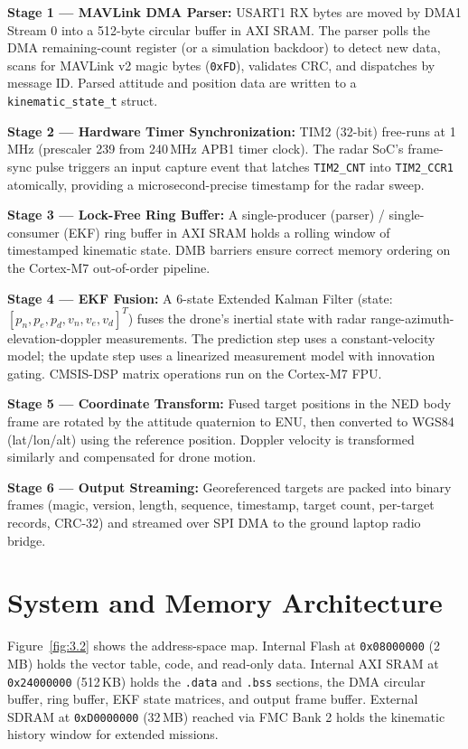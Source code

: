 \textbf{Stage 1 --- MAVLink DMA Parser:} USART1 RX bytes are moved by DMA1 Stream 0 into a 512-byte circular buffer in AXI SRAM. The parser polls the DMA remaining-count register (or a simulation backdoor) to detect new data, scans for MAVLink v2 magic bytes (\texttt{0xFD}), validates CRC, and dispatches by message ID. Parsed attitude and position data are written to a \texttt{kinematic\_state\_t} struct.

\textbf{Stage 2 --- Hardware Timer Synchronization:} TIM2 (32-bit) free-runs at 1\,MHz (prescaler 239 from 240\,MHz APB1 timer clock). The radar SoC's frame-sync pulse triggers an input capture event that latches \texttt{TIM2\_CNT} into \texttt{TIM2\_CCR1} atomically, providing a microsecond-precise timestamp for the radar sweep.

\textbf{Stage 3 --- Lock-Free Ring Buffer:} A single-producer (parser) / single-consumer (EKF) ring buffer in AXI SRAM holds a rolling window of timestamped kinematic state. DMB barriers ensure correct memory ordering on the Cortex-M7 out-of-order pipeline.

\textbf{Stage 4 --- EKF Fusion:} A 6-state Extended Kalman Filter (state: $[p_n, p_e, p_d, v_n, v_e, v_d]^T$) fuses the drone's inertial state with radar range-azimuth-elevation-doppler measurements. The prediction step uses a constant-velocity model; the update step uses a linearized measurement model with innovation gating. CMSIS-DSP matrix operations run on the Cortex-M7 FPU.

\textbf{Stage 5 --- Coordinate Transform:} Fused target positions in the NED body frame are rotated by the attitude quaternion to ENU, then converted to WGS84 (lat/lon/alt) using the reference position. Doppler velocity is transformed similarly and compensated for drone motion.

\textbf{Stage 6 --- Output Streaming:} Georeferenced targets are packed into binary frames (magic, version, length, sequence, timestamp, target count, per-target records, CRC-32) and streamed over SPI DMA to the ground laptop radio bridge.

\section{System and Memory Architecture}

Figure~\ref{fig:3.2} shows the address-space map. Internal Flash at \texttt{0x08000000} (2\,MB) holds the vector table, code, and read-only data. Internal AXI SRAM at \texttt{0x24000000} (512\,KB) holds the \texttt{.data} and \texttt{.bss} sections, the DMA circular buffer, ring buffer, EKF state matrices, and output frame buffer. External SDRAM at \texttt{0xD0000000} (32\,MB) reached via FMC Bank 2 holds the kinematic history window for extended missions.

